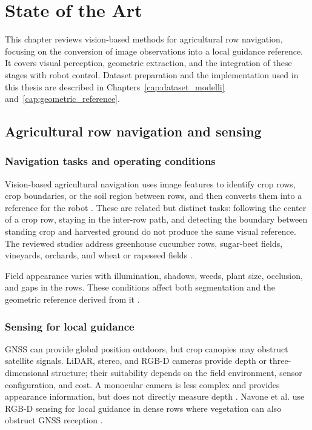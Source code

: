 \chapter{State of the Art}
\label{cap:stato_arte}

This chapter reviews vision-based methods for agricultural row
navigation, focusing on the conversion of image observations into a
local guidance reference. It covers visual perception, geometric
extraction, and the integration of these stages with robot control.
Dataset preparation and the implementation used in this thesis are
described in Chapters~\ref{cap:dataset_modelli}
and~\ref{cap:geometric_reference}.

\section{Agricultural row navigation and sensing}
\label{sec:navigazione_contesto}

\subsection{Navigation tasks and operating conditions}
\label{subsec:scenari_navigazione}

Vision-based agricultural navigation uses image features to identify
crop rows, crop boundaries, or the soil region between rows, and then
converts them into a reference for the robot \cite{bai2023vision}.
These are related but distinct tasks: following the center of a crop
row, staying in the inter-row path, and detecting the boundary between
standing crop and harvested ground do not produce the same visual
reference. The reviewed studies address greenhouse cucumber rows,
sugar-beet fields, vineyards, orchards, and wheat or rapeseed fields
\cite{chen2021navigation,silva2023rowdetection,mendez2023vineyards,
navone2025gpsfree,kneip2020cropedge}.

Field appearance varies with illumination, shadows, weeds, plant size,
occlusion, and gaps in the rows. These conditions affect both
segmentation and the geometric reference derived from it
\cite{silva2023rowdetection,navone2025gpsfree}.

\subsection{Sensing for local guidance}
\label{subsec:vision_based}

GNSS can provide global position outdoors, but crop canopies may
obstruct satellite signals. LiDAR, stereo, and RGB-D cameras provide
depth or three-dimensional structure; their suitability depends on the
field environment, sensor configuration, and cost. A monocular camera
is less complex and provides appearance information, but does not
directly measure depth \cite[Sections~2.1--2.3]{bai2023vision}.
Navone et al. use RGB-D sensing for local guidance in dense rows where
vegetation can also obstruct GNSS reception \cite{navone2025gpsfree}.

